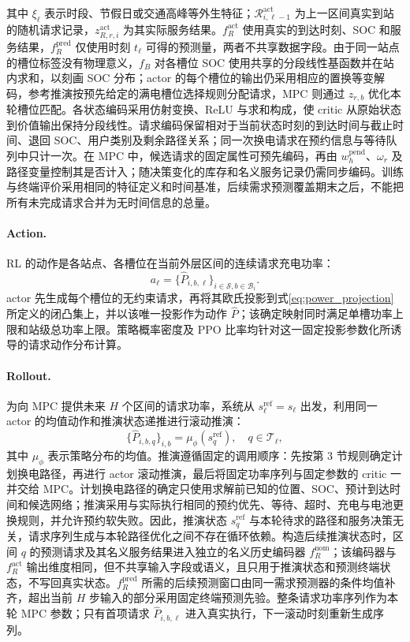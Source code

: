 \documentclass[12pt,a4paper,UTF8]{ctexart}
\begin{document}
其中 $\xi_\ell$ 表示时段、节假日或交通高峰等外生特征；$\mathcal R_{i,\ell-1}^{\mathrm{act}}$ 为上一区间真实到站的随机请求记录，$z_{R,r,i}^{\mathrm{act}}$ 为其实际服务结果。$f_R^{\mathrm{act}}$ 使用真实的到达时刻、SOC 和服务结果，$f_R^{\mathrm{pred}}$ 仅使用时刻 $t_\ell$ 可得的预测量，两者不共享数据字段。由于同一站点的槽位标签没有物理意义，$f_B$ 对各槽位 SOC 使用共享的分段线性基函数并在站内求和，以刻画 SOC 分布；actor 的每个槽位的输出仍采用相应的置换等变解码，参考推演按预先给定的满电槽位选择规则分配请求，MPC 则通过 $z_{r,b}$ 优化本轮槽位匹配。各状态编码采用仿射变换、ReLU 与求和构成，使 critic 从原始状态到价值输出保持分段线性。请求编码保留相对于当前状态时刻的到达时间与截止时间、退回 SOC、用户类别及剩余路径关系；同一次换电请求在预约信息与等待队列中只计一次。在 MPC 中，候选请求的固定属性可预先编码，再由 $w_h^{\mathrm{pend}}$、$\omega_r$ 及路径变量控制其是否计入；随决策变化的库存和名义服务记录仍需同步编码。训练与终端评价采用相同的特征定义和时间基准，后续需求预测覆盖期末之后，不能把所有未完成请求合并为无时间信息的总量。

\paragraph{Action.}
RL 的动作是各站点、各槽位在当前外层区间的连续请求充电功率：
\begin{equation}
a_\ell=
\{\widehat P_{i,b,\ell}\}_{i\in\mathcal S,b\in\mathcal B_i}.
\label{eq:rl_action}
\end{equation}
actor 先生成每个槽位的无约束请求，再将其欧氏投影到式\eqref{eq:power_projection}所定义的闭凸集上，并以该唯一投影作为动作 $\widehat P$；该确定映射同时满足单槽功率上限和站级总功率上限。策略概率密度及 PPO 比率均针对这一固定投影参数化所诱导的请求动作分布计算。

\paragraph{Rollout.}
为向 MPC 提供未来 $H$ 个区间的请求功率，系统从
$s_{\ell}^{\mathrm{ref}}=s_\ell$ 出发，利用同一 actor 的均值动作和推演状态递推进行滚动推演：
\begin{equation}
\{\widehat P_{i,b,q}\}_{i,b}
=
\mu_\phi(s_{q}^{\mathrm{ref}}),
\quad q\in\mathcal T_\ell,
\label{eq:rl_power_rollout}
\end{equation}
其中 $\mu_\phi$ 表示策略分布的均值。推演遵循固定的调用顺序：先按第 3 节规则确定计划换电路径，再进行 actor 滚动推演，最后将固定功率序列与固定参数的 critic 一并交给 MPC。计划换电路径的确定只使用求解前已知的位置、SOC、预计到达时间和候选网络；推演采用与实际执行相同的预约优先、等待、超时、充电与电池更换规则，并允许预约软失败。因此，推演状态 $s_q^{\mathrm{ref}}$ 与本轮待求的路径和服务决策无关，请求序列生成与本轮路径优化之间不存在循环依赖。构造后续推演状态时，区间 $q$ 的预测请求及其名义服务结果进入独立的名义历史编码器 $f_R^{\mathrm{nom}}$；该编码器与 $f_R^{\mathrm{act}}$ 输出维度相同，但不共享输入字段或语义，且只用于推演状态和预测终端状态，不写回真实状态。$f_R^{\mathrm{pred}}$ 所需的后续预测窗口由同一需求预测器的条件均值补齐，超出当前 $H$ 步输入的部分采用固定终端预测先验。整条请求功率序列作为本轮 MPC 参数；只有首项请求 $\widehat P_{i,b,\ell}$ 进入真实执行，下一滚动时刻重新生成序列。
\end{document}
